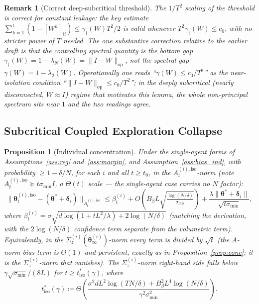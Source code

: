 \documentclass[11pt]{article}
\newtheorem{proposition}[theorem]{Proposition}
\newtheorem*{remark}{Remark}
\begin{document}
\begin{remark}[Correct deep-subcritical threshold]
The $1/T^2$ scaling of the threshold is correct for constant leakage:
the key estimate $\sum_{k=1}^t(1-[W^k]_{ii})\leq\gamma_\dagger(W)T^2/2$
is valid whenever $T^2\gamma_\dagger(W)\leq c_0$, with no stricter power
of $T$ needed.  The one substantive correction relative to the earlier
draft is that the controlling spectral quantity is the \emph{bottom}
gap $\gamma_\dagger(W)=1-\lambda_N(W)=\|I-W\|_{\mathrm{op}}$, not the
\emph{spectral} gap $\gamma(W)=1-\lambda_2(W)$.  Operationally one reads
``$\gamma(W)\leq c_0/T^2$'' as the near-isolation condition
``$\|I-W\|_{\mathrm{op}}\leq c_0/T^2$''; in the deeply subcritical
(nearly disconnected, $W\approx I$) regime that motivates this lemma,
the whole non-principal spectrum sits near $1$ and the two readings
agree.
\end{remark}

\subsection{Subcritical Coupled Exploration Collapse}

\begin{proposition}[Individual concentration]\label{prop:conc_ind}
Under the single-agent forms of Assumptions~\ref{ass:reg}
and~\ref{ass:margin}, and Assumption~\ref{ass:bias_ind},
with probability $\geq 1-\delta/N$, for each $i$ and all $t\geq t_0$,
in the $A_t^{(i),\mathrm{iso}}$-norm (note $A_t^{(i),\mathrm{iso}}\succeq t\sigma_{\min}I$,
a $\Theta(t)$ scale --- the single-agent case carries no $N$ factor):
\[
\|\bm{\theta}_t^{(i),\mathrm{iso}}-(\bm{\theta}^{\!*}+\bm{\delta}_i)\|_{A_t^{(i),\mathrm{iso}}}
\leq\beta_t^{(i)}
+O\!\left(B_\beta L\sqrt{\tfrac{\log(N/\delta)}{\sigma_{\min}}}\right)
+\frac{\lambda\|\bm{\theta}^{\!*}+\bm{\delta}_i\|}{\sqrt{t\sigma_{\min}}},
\]
where $\beta_t^{(i)}=\sigma\sqrt{d\log(1+tL^2/\lambda)+2\log(N/\delta)}$
(matching the derivation, with the $2\log(N/\delta)$ confidence term
separate from the volumetric term).  Equivalently, in the
$\Sigma_z^{(i)}(\bm{\theta}_\infty^{(i)})$-norm every term is divided by
$\sqrt t$ (the $A$-norm bias term is $\Theta(1)$ and persistent, exactly
as in Proposition~\ref{prop:conc}; it is the $\Sigma_z^{(i)}$-norm that
vanishes).
The $\Sigma_z^{(i)}$-norm right-hand side falls below
$\gamma\sqrt{\sigma_{\min}}/(8L)$ for
$t\geq t_{\mathrm{iso}}^*(\gamma)$, where
\begin{equation}
t_{\mathrm{iso}}^*(\gamma)\coloneqq
\Theta\!\left(\frac{\sigma^2 dL^2\log(TN/\delta)+B_\beta^2 L^4\log(N/\delta)}
{\gamma^2\sigma_{\min}^2}\right).
\label{eq:tiso_star}
\end{equation}
\end{proposition}
\end{document}
